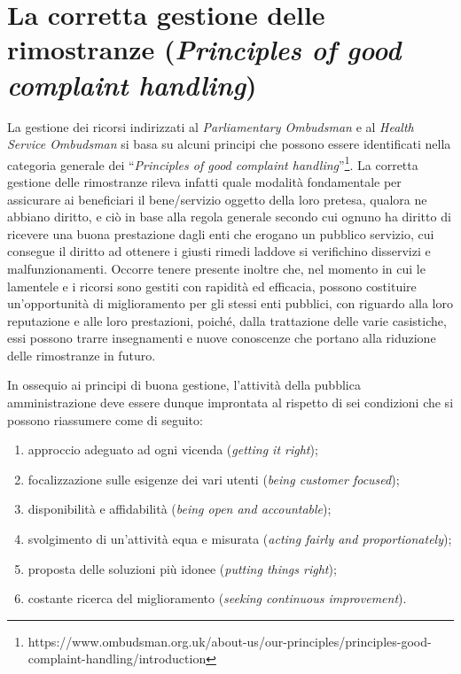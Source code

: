 \documentclass[12pt,it,a4paper,]{report}
\providecommand{\tightlist}{%
  \setlength{\itemsep}{0pt}\setlength{\parskip}{0pt}}
\begin{document}
\hypertarget{la-corretta-gestione-delle-rimostranze-principles-of-good-complaint-handling}{%
\section{\texorpdfstring{La corretta gestione delle rimostranze
(\emph{Principles of good complaint
handling})}{La corretta gestione delle rimostranze (Principles of good complaint handling)}}\label{la-corretta-gestione-delle-rimostranze-principles-of-good-complaint-handling}}

La gestione dei ricorsi indirizzati al \emph{Parliamentary Ombudsman} e
al \emph{Health Service Ombudsman} si basa su alcuni principi che
possono essere identificati nella categoria generale dei
``\emph{Principles of good complaint handling}''\footnote{https://www.ombudsman.org.uk/about-us/our-principles/principles-good-complaint-handling/introduction}.
La corretta gestione delle rimostranze rileva infatti quale modalità
fondamentale per assicurare ai beneficiari il bene/servizio oggetto
della loro pretesa, qualora ne abbiano diritto, e ciò in base alla
regola generale secondo cui ognuno ha diritto di ricevere una buona
prestazione dagli enti che erogano un pubblico servizio, cui consegue il
diritto ad ottenere i giusti rimedi laddove si verifichino disservizi e
malfunzionamenti. Occorre tenere presente inoltre che, nel momento in
cui le lamentele e i ricorsi sono gestiti con rapidità ed efficacia,
possono costituire un'opportunità di miglioramento per gli stessi enti
pubblici, con riguardo alla loro reputazione e alle loro prestazioni,
poiché, dalla trattazione delle varie casistiche, essi possono trarre
insegnamenti e nuove conoscenze che portano alla riduzione delle
rimostranze in futuro.

In ossequio ai principi di buona gestione, l'attività della pubblica
amministrazione deve essere dunque improntata al rispetto di sei
condizioni che si possono riassumere come di seguito:

\begin{enumerate}
\def\labelenumi{\arabic{enumi})}
\tightlist
\item
  approccio adeguato ad ogni vicenda (\emph{getting it right});
\item
  focalizzazione sulle esigenze dei vari utenti (\emph{being customer
  focused});
\item
  disponibilità e affidabilità (\emph{being open and accountable});
\item
  svolgimento di un'attività equa e misurata (\emph{acting fairly and
  proportionately});
\item
  proposta delle soluzioni più idonee (\emph{putting things right});
\item
  costante ricerca del miglioramento (\emph{seeking continuous
  improvement}).
\end{enumerate}
\end{document}
